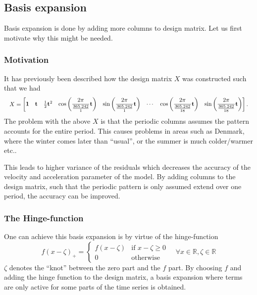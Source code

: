 \subsection{Basis expansion}

Basis expansion is done by adding more columns to design matrix. Let us first motivate why this might be needed.

\subsubsection{Motivation}
It has previously been described how the design matrix $X$ was constructed such that we had 
\begin{equation*}
\resizebox{\textwidth}{!}{$
X = \left[\begin{matrix}
	\mathbf{1} &
	\mathbf{t} &
	\frac{1}{2} \mathbf{t}^2 &
	\cos\left( \dfrac{2 \pi}{\frac{365.242}{1}} \mathbf{t} \right) &
	\sin\left( \dfrac{2 \pi}{\frac{365.242}{1}} \mathbf{t} \right) &
	\cdots &
	\cos\left( \dfrac{2 \pi}{\frac{365.242}{18}} \mathbf{t} \right) &
	\sin\left( \dfrac{2 \pi}{\frac{365.242}{18}} \mathbf{t} \right)
\end{matrix}\right].
$}
\end{equation*}
The problem with the above $X$ is that the periodic columns assumes the pattern accounts for the entire period. This causes problems in areas such as Denmark, where the winter comes later than ``usual'', or the summer is much colder/warmer etc..

This leads to higher variance of the residuals which decreases the accuracy of the velocity and acceleration parameter of the model. By adding columns to the design matrix, such that the periodic pattern is only assumed extend over one period, the accuracy can be improved.

\subsubsection{The Hinge-function}

One can achieve this basis expansion is by virtue of the hinge-function
\begin{equation}
f(x - \zeta)_+ = \begin{cases}
  f(x - \zeta) & \text{if } x - \zeta \ge 0 \\
  0                 & \text{otherwise}
\end{cases} \quad \forall x \in \mathbb{R}, \zeta \in \mathbb{R}
\end{equation}
$\zeta$ denotes the ``knot'' between the zero part and the $f$ part. By choosing $f$ and adding the hinge function to the design matrix, a basis expansion where terms are only active for some parts of the time series is obtained.

